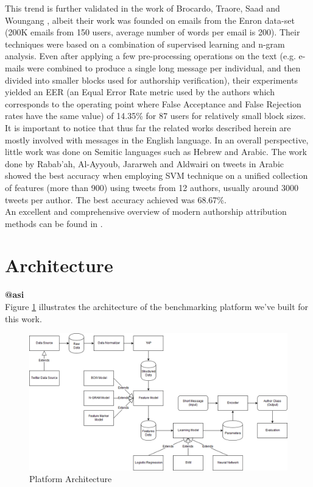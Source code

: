 \documentclass[a4paper]{article}
\begin{document}
This trend is further validated in the work of Brocardo, Traore, Saad and Woungang \cite{brocardo}, albeit their work was founded on emails from the Enron data-set (200K emails from 150 users, average number of words per email is 200). Their techniques were based on a combination of supervised learning and n-gram analysis. Even after applying a few pre-processing operations on the text (e.g. e-mails were combined to produce a single long message per individual, and then divided into smaller blocks used for authorship verification), their experiments yielded an EER (an Equal Error Rate metric used by the authors which corresponds to the operating point where False Acceptance and False Rejection rates have the same value) of 14.35\% for 87 users for relatively small block sizes.\\
It is important to notice that thus far the related works described herein are mostly involved with messages in the English language. In an overall perspective, little work was done on Semitic languages such as Hebrew and Arabic. The work done by Rabab’ah, Al-Ayyoub, Jararweh and Aldwairi \cite{rabab} on tweets in Arabic showed the best accuracy when employing SVM technique on a unified collection of features (more than 900) using tweets from 12 authors, usually around 3000 tweets per author. The best accuracy achieved was 68.67\%.\\
An excellent and comprehensive overview of modern authorship attribution methods can be found in \cite{stamatatos}.



\section{Architecture}
\label{Architecture}
\textbf{@asi}\\

Figure \ref{fig:architecture} illustrates the architecture of the benchmarking platform we've built for this work.\\
\begin{figure}[hb]
	\includegraphics[width=1\textwidth]{"architecture/NLP Author Classification Architecture"}
	\caption{Platform Architecture}
		\label{fig:architecture}
\end{figure}\\
\end{document}
